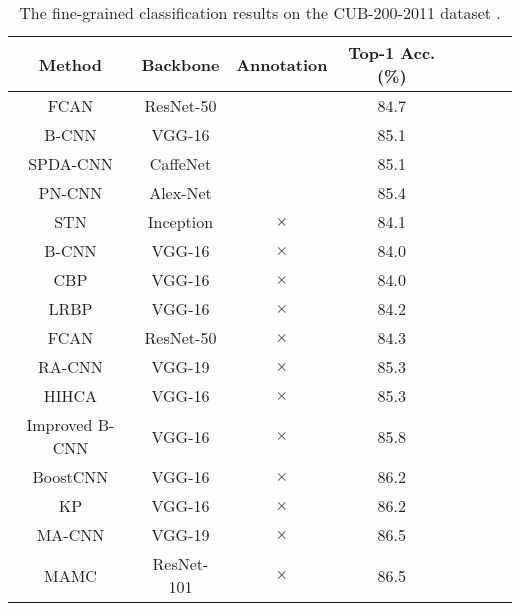 \documentclass[10pt,twocolumn,letterpaper]{article}
\begin{document}
\begin{table}[t]
    \centering
    \small { \setlength{\tabcolsep}{1.0pt}
    \caption{The fine-grained classification results on the CUB-200-2011 dataset \cite{report-wahcub_200_2011}.}
    \label{tab:birds}    
    \begin{tabular}{ccccpppp}
    	\toprule
    	                   Method                     &   Backbone   & Annotation & Top-1 Acc. (\%) \\ \midrule
    	   FCAN \cite{DBLP:journals/corr/LiuXWL16}    &  ResNet-50   & \checkmark &      84.7       \\
    	     B-CNN \cite{DBLP:conf/iccv/LinRM15}      &    VGG-16    & \checkmark &      85.1       \\
    	SPDA-CNN \cite{DBLP:conf/cvpr/ZhangXEHZEM16}  &   CaffeNet   & \checkmark &      85.1       \\
    	PN-CNN \cite{DBLP:journals/corr/BransonHBP14} &   Alex-Net   & \checkmark &      85.4       \\ \midrule
    	  STN \cite{DBLP:conf/nips/JaderbergSZK15}    &  Inception   &  $\times$  &      84.1       \\
    	     B-CNN \cite{DBLP:conf/iccv/LinRM15}      &    VGG-16    &  $\times$  &      84.0       \\
    	   CBP \cite{DBLP:journals/corr/GaoBZD15}     &    VGG-16    &  $\times$  &      84.0       \\
    	   LRBP \cite{DBLP:journals/corr/KongF16}     &    VGG-16    &  $\times$  &      84.2       \\
    	   FCAN \cite{DBLP:journals/corr/LiuXWL16}    &  ResNet-50   &  $\times$  &      84.3       \\
    	     RA-CNN \cite{DBLP:conf/cvpr/FuZM17}      &    VGG-19    &  $\times$  &      85.3       \\
    	     HIHCA \cite{DBLP:conf/iccv/CaiZZ17}      &    VGG-16    &  $\times$  &      85.3       \\
    	 Improved B-CNN \cite{DBLP:conf/bmvc/LinM17}  &    VGG-16    &  $\times$  &      85.8       \\
    	BoostCNN \cite{DBLP:conf/bmvc/MoghimiBSYVL16} &    VGG-16    &  $\times$  &      86.2       \\
    	     KP \cite{DBLP:conf/cvpr/CuiZWLLB17}      &    VGG-16    &  $\times$  &      86.2       \\
    	   MA-CNN \cite{DBLP:conf/iccv/ZhengFML17}    &    VGG-19    &  $\times$  &      86.5       \\
    	     MAMC \cite{DBLP:conf/eccv/SunYZD18}      &  ResNet-101  &  $\times$  &      86.5       \\

\end{tabular}}
\end{table}
\end{document}
